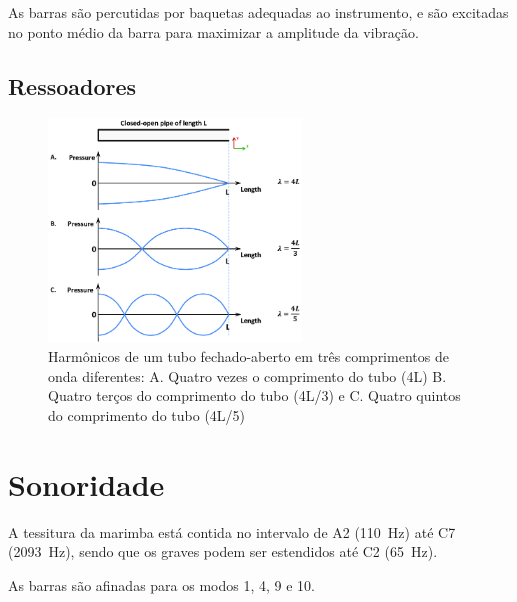 \documentclass{article}
\begin{document}
As barras são percutidas por baquetas adequadas ao instrumento, e são excitadas no ponto médio da barra para maximizar a amplitude da vibração.

\subsection{Ressoadores}

\begin{figure}[h!]
	\centering
	\includegraphics[width=0.6\textwidth]{Harmonics-of-a-closed-open-pipe-in-three-different-wavelengths-A-Four-times-the-length.png}
	\caption{Harmônicos de um tubo fechado-aberto em três comprimentos de onda diferentes: A. Quatro vezes o comprimento do tubo (4L) B. Quatro terços do comprimento do tubo (4L/3) e C. Quatro quintos do comprimento do tubo (4L/5)~\cite{closed_open_pipe}}
\end{figure}




\section{Sonoridade}


A tessitura da marimba está contida no intervalo de A2 (\SI{110}{\hertz}) até C7 (\SI{2093}{\hertz}), sendo que os graves podem ser estendidos até C2 (\SI{65}{\hertz}). 

As barras são afinadas para os modos 1, 4, 9 e 10.



\end{document}
